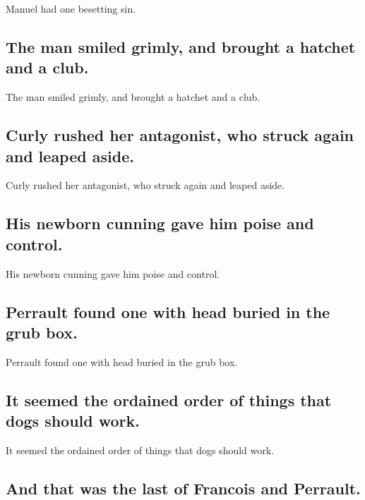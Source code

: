 \documentclass[]{article}
\begin{document}
Manuel had one besetting sin.

\hypertarget{the-man-smiled-grimly-and-brought-a-hatchet-and-a-club.}{%
\subsection{The man smiled grimly, and brought a hatchet and a
club.}\label{the-man-smiled-grimly-and-brought-a-hatchet-and-a-club.}}

The man smiled grimly, and brought a hatchet and a club.

\hypertarget{curly-rushed-her-antagonist-who-struck-again-and-leaped-aside.}{%
\subsection{Curly rushed her antagonist, who struck again and leaped
aside.}\label{curly-rushed-her-antagonist-who-struck-again-and-leaped-aside.}}

Curly rushed her antagonist, who struck again and leaped aside.

\hypertarget{his-newborn-cunning-gave-him-poise-and-control.}{%
\subsection{His newborn cunning gave him poise and
control.}\label{his-newborn-cunning-gave-him-poise-and-control.}}

His newborn cunning gave him poise and control.

\hypertarget{perrault-found-one-with-head-buried-in-the-grub-box.}{%
\subsection{Perrault found one with head buried in the grub
box.}\label{perrault-found-one-with-head-buried-in-the-grub-box.}}

Perrault found one with head buried in the grub box.

\hypertarget{it-seemed-the-ordained-order-of-things-that-dogs-should-work.}{%
\subsection{It seemed the ordained order of things that dogs should
work.}\label{it-seemed-the-ordained-order-of-things-that-dogs-should-work.}}

It seemed the ordained order of things that dogs should work.

\hypertarget{and-that-was-the-last-of-francois-and-perrault.}{%
\subsection{And that was the last of Francois and
Perrault.}\label{and-that-was-the-last-of-francois-and-perrault.}}
\end{document}
